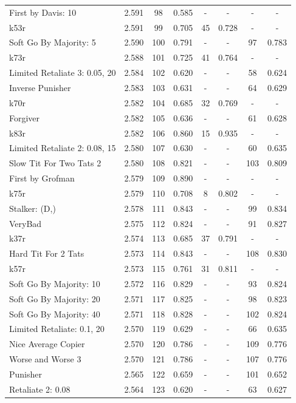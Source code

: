 \begin{tabular}{lccccccc}
First by Davis: 10 & 2.591 & 98 & 0.585 & - & - & - & - \\
k53r & 2.591 & 99 & 0.705 & 45 & 0.728 & - & - \\
Soft Go By Majority: 5 & 2.590 & 100 & 0.791 & - & - & 97 & 0.783 \\
k73r & 2.588 & 101 & 0.725 & 41 & 0.764 & - & - \\
Limited Retaliate 3: 0.05, 20 & 2.584 & 102 & 0.620 & - & - & 58 & 0.624 \\
Inverse Punisher & 2.583 & 103 & 0.631 & - & - & 64 & 0.629 \\
k70r & 2.582 & 104 & 0.685 & 32 & 0.769 & - & - \\
Forgiver & 2.582 & 105 & 0.636 & - & - & 61 & 0.628 \\
k83r & 2.582 & 106 & 0.860 & 15 & 0.935 & - & - \\
Limited Retaliate 2: 0.08, 15 & 2.580 & 107 & 0.630 & - & - & 60 & 0.635 \\
Slow Tit For Two Tats 2 & 2.580 & 108 & 0.821 & - & - & 103 & 0.809 \\
First by Grofman & 2.579 & 109 & 0.890 & - & - & - & - \\
k75r & 2.579 & 110 & 0.708 & 8 & 0.802 & - & - \\
Stalker: (D,) & 2.578 & 111 & 0.843 & - & - & 99 & 0.834 \\
VeryBad & 2.575 & 112 & 0.824 & - & - & 91 & 0.827 \\
k37r & 2.574 & 113 & 0.685 & 37 & 0.791 & - & - \\
Hard Tit For 2 Tats & 2.573 & 114 & 0.843 & - & - & 108 & 0.830 \\
k57r & 2.573 & 115 & 0.761 & 31 & 0.811 & - & - \\
Soft Go By Majority: 10 & 2.572 & 116 & 0.829 & - & - & 93 & 0.824 \\
Soft Go By Majority: 20 & 2.571 & 117 & 0.825 & - & - & 98 & 0.823 \\
Soft Go By Majority: 40 & 2.571 & 118 & 0.828 & - & - & 102 & 0.824 \\
Limited Retaliate: 0.1, 20 & 2.570 & 119 & 0.629 & - & - & 66 & 0.635 \\
Nice Average Copier & 2.570 & 120 & 0.786 & - & - & 109 & 0.776 \\
Worse and Worse 3 & 2.570 & 121 & 0.786 & - & - & 107 & 0.776 \\
Punisher & 2.565 & 122 & 0.659 & - & - & 101 & 0.652 \\
Retaliate 2: 0.08 & 2.564 & 123 & 0.620 & - & - & 63 & 0.627 \\

\end{tabular}
